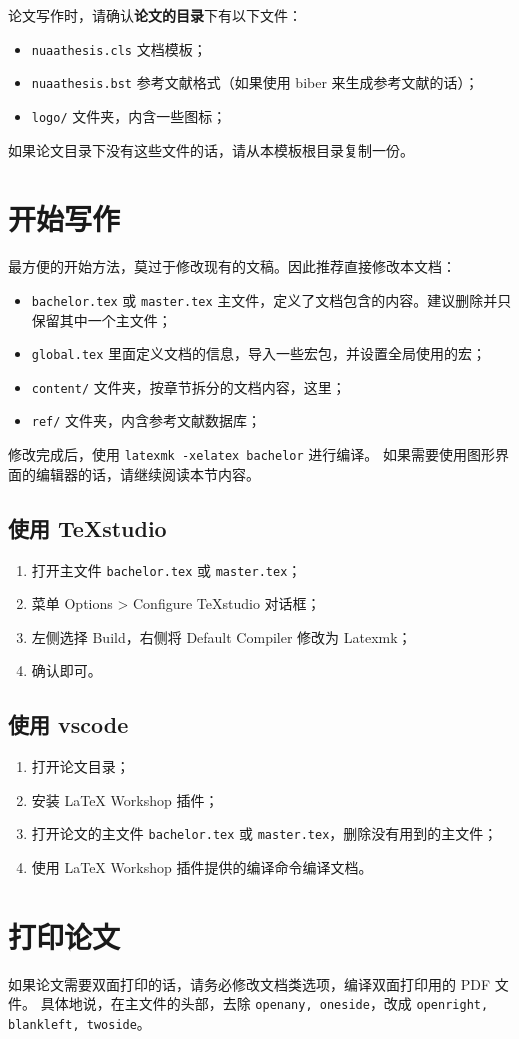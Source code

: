 论文写作时，请确认\textbf{论文的目录}下有以下文件：
\begin{itemize}
  \item \verb|nuaathesis.cls| 文档模板；
  \item \verb|nuaathesis.bst| 参考文献格式（如果使用 biber 来生成参考文献的话）；
  \item \verb|logo/| 文件夹，内含一些图标；
\end{itemize}

如果论文目录下没有这些文件的话，请从本模板根目录复制一份。

\section{开始写作}

最方便的开始方法，莫过于修改现有的文稿。因此推荐直接修改本文档：
\begin{itemize}
  \item \verb|bachelor.tex| 或 \verb|master.tex| 主文件，定义了文档包含的内容。建议删除并只保留其中一个主文件；
  \item \verb|global.tex| 里面定义文档的信息，导入一些宏包，并设置全局使用的宏；
  \item \verb|content/| 文件夹，按章节拆分的文档内容，这里；
  \item \verb|ref/| 文件夹，内含参考文献数据库；
\end{itemize}

修改完成后，使用 \verb|latexmk -xelatex bachelor| 进行编译。
如果需要使用图形界面的编辑器的话，请继续阅读本节内容。

\subsection{使用 TeXstudio}
\begin{enumerate}
\item 打开主文件 \verb|bachelor.tex| 或 \verb|master.tex|；
\item 菜单 Options > Configure TeXstudio 对话框；
\item 左侧选择 Build，右侧将 Default Compiler 修改为 Latexmk；
\item 确认即可。
\end{enumerate}

\subsection{使用 vscode}
\begin{enumerate}
\item 打开论文目录；
\item 安装 LaTeX Workshop 插件；
\item 打开论文的主文件 \verb|bachelor.tex| 或 \verb|master.tex|，删除没有用到的主文件；
\item 使用 LaTeX Workshop 插件提供的编译命令编译文档。
\end{enumerate}

\section{打印论文}

如果论文需要双面打印的话，请务必修改文档类选项，编译双面打印用的 PDF 文件。
具体地说，在主文件的头部，去除 \texttt{openany, oneside}，改成 \texttt{openright, blankleft, twoside}。
